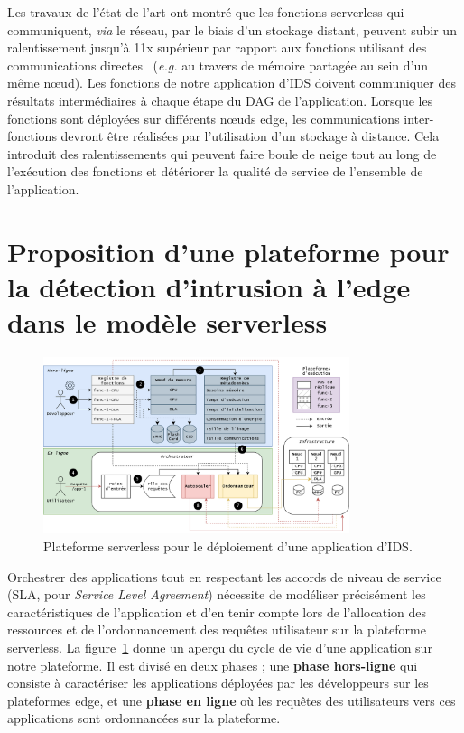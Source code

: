 Les travaux de l'état de l'art ont montré que les fonctions serverless qui communiquent, \textit{via} le réseau, par le biais d'un stockage distant, peuvent subir un ralentissement jusqu'à 11x supérieur par rapport aux fonctions utilisant des communications directes~\cite{wawrzoniakBoxerDataAnalytics2021a} (\textit{e.g.} au travers de mémoire partagée au sein d'un même nœud). Les fonctions de notre application d'IDS doivent communiquer des résultats intermédiaires à chaque étape du DAG de l'application. Lorsque les fonctions sont déployées sur différents nœuds edge, les communications inter-fonctions devront être réalisées par l'utilisation d'un stockage à distance. Cela introduit des ralentissements qui peuvent faire boule de neige tout au long de l'exécution des fonctions et détériorer la qualité de service de l'ensemble de l'application.



\section{Proposition d'une plateforme pour la détection d'intrusion à l'edge dans le modèle serverless}
\label{section:herocache-before-contrib}

\begin{figure}[!ht]
    \centering
    \includegraphics[width=0.8\textwidth]{5_Chapitre5/figures/serverless-platform-storage.png}
    \caption{Plateforme serverless pour le déploiement d'une application d'\gls{IDS}.}
    \label{figure:herocache-serverless-platform}
\end{figure}

Orchestrer des applications tout en respectant les accords de niveau de service (\gls{SLA}, pour \textit{Service Level Agreement}) nécessite de modéliser précisément les caractéristiques de l'application et d'en tenir compte lors de l'allocation des ressources et de l'ordonnancement des requêtes utilisateur sur la plateforme serverless. La figure~\ref{figure:herocache-serverless-platform} donne un aperçu du cycle de vie d'une application sur notre plateforme. Il est divisé en deux phases ; une \textbf{phase hors-ligne} qui consiste à caractériser les applications déployées par les développeurs sur les plateformes edge, et une \textbf{phase en ligne} où les requêtes des utilisateurs vers ces applications sont ordonnancées sur la plateforme.

